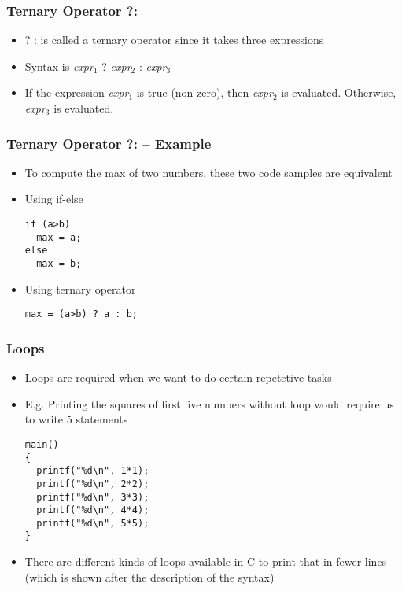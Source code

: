 \documentclass[11pt]{beamer}
\begin{document}
\begin{frame}[fragile]\frametitle{Ternary Operator ?:}
\label{sec-1-12}

\begin{itemize}
\item ? : is called a ternary operator since it takes three expressions
\item Syntax is
  \emph{expr$_1$} ? \emph{expr$_2$} : \emph{expr$_3$}
\item If the expression \emph{expr$_1$} is true (non-zero), then \emph{expr$_2$} is evaluated. Otherwise, \emph{expr$_3$} is evaluated.
\end{itemize}
\end{frame}
\begin{frame}[fragile]\frametitle{Ternary Operator ?: -- Example}
\label{sec-1-13}

\begin{itemize}
\item To compute the max of two numbers, these two code samples are equivalent
\item Using if-else

\begin{verbatim}
if (a>b)
  max = a;
else
  max = b;
\end{verbatim}
\item Using ternary operator

\begin{verbatim}
max = (a>b) ? a : b;
\end{verbatim}
\end{itemize}
\end{frame}
\begin{frame}[fragile]\frametitle{Loops}
\label{sec-1-14}

\begin{itemize}
\item Loops are required when we want to do certain repetetive tasks
\item E.g. Printing the squares of first five numbers without loop would require us to write 5 statements

\begin{verbatim}
main()
{
  printf("%d\n", 1*1);
  printf("%d\n", 2*2);
  printf("%d\n", 3*3);
  printf("%d\n", 4*4);
  printf("%d\n", 5*5);
}
\end{verbatim}
\item There are different kinds of loops available in C to print that in fewer lines (which is shown after the description of the syntax)
\end{itemize}
\end{frame}
\end{document}
